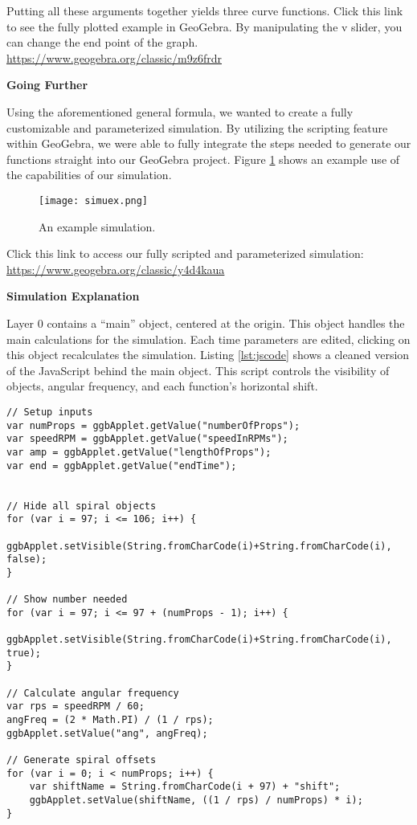 Putting all these arguments together yields three curve functions.
Click this link to see the fully plotted example in GeoGebra. By manipulating the v slider, you can change the end point of the graph.
\url{https://www.geogebra.org/classic/m9z6frdr}

\noindent
\textbf{Going Further}

Using the aforementioned general formula, we wanted to create a fully customizable and parameterized simulation. By utilizing the scripting feature within GeoGebra, we were able to fully integrate the steps needed to generate our functions straight into our GeoGebra project. Figure \ref{fig:simuex1} shows an example use of the capabilities of our simulation.
\begin{figure}[ht]
\texttt{[image: simuex.png]}
\caption{An example simulation.}
\label{fig:simuex1}
\end{figure}

Click this link to access our fully scripted and parameterized simulation: \url{https://www.geogebra.org/classic/y4d4kaua}

\noindent
\textbf{Simulation Explanation}

Layer 0 contains a “main” object, centered at the origin. This object handles the main calculations for the simulation. Each time parameters are edited, clicking on this object recalculates the simulation.
Listing \ref{lst:jscode} shows a cleaned version of the JavaScript behind the main object. This script controls the visibility of objects, angular frequency, and each function's horizontal shift.
\begin{lstlisting}[caption={JavaScript attached to main object},label={lst:jscode},captionpos=b]
// Setup inputs
var numProps = ggbApplet.getValue("numberOfProps");
var speedRPM = ggbApplet.getValue("speedInRPMs");
var amp = ggbApplet.getValue("lengthOfProps");
var end = ggbApplet.getValue("endTime");


// Hide all spiral objects
for (var i = 97; i <= 106; i++) {
    ggbApplet.setVisible(String.fromCharCode(i)+String.fromCharCode(i), false);
}

// Show number needed
for (var i = 97; i <= 97 + (numProps - 1); i++) {
    ggbApplet.setVisible(String.fromCharCode(i)+String.fromCharCode(i), true);
}

// Calculate angular frequency
var rps = speedRPM / 60;
angFreq = (2 * Math.PI) / (1 / rps);
ggbApplet.setValue("ang", angFreq);

// Generate spiral offsets
for (var i = 0; i < numProps; i++) {
    var shiftName = String.fromCharCode(i + 97) + "shift";
    ggbApplet.setValue(shiftName, ((1 / rps) / numProps) * i);
}

\end{lstlisting}

